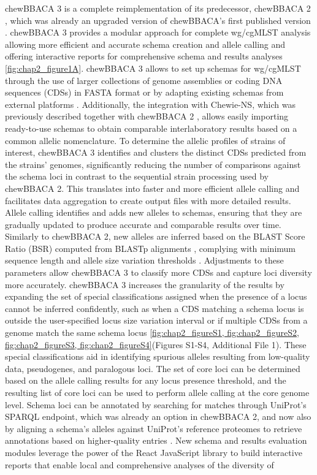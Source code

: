 chewBBACA 3 is a complete reimplementation of its predecessor, chewBBACA 2 \citep{mamede_chewie_2021}, which was already an upgraded version of chewBBACA’s first published version \citep{silva_chewbbaca_2018}. chewBBACA 3 provides a modular approach for complete wg/cgMLST analysis allowing more efficient and accurate schema creation and allele calling and offering interactive reports for comprehensive schema and results analyses \ref{fig:chap2_figure1A}. chewBBACA 3 allows to set up schemas for wg/cgMLST through the use of larger collections of genome assemblies or coding DNA sequences (CDSs) in FASTA format or by adapting existing schemas from external platforms \citep{jolley_bigsdb_2010, zhou_enterobase_2020, noauthor_cgmlstorg_nodate}. Additionally, the integration with Chewie-NS, which was previously described together with chewBBACA 2 \citep{mamede_chewie_2021}, allows easily importing ready-to-use schemas to obtain comparable interlaboratory results based on a common allelic nomenclature. To determine the allelic profiles of strains of interest, chewBBACA 3 identifies and clusters the distinct CDSs predicted from the strains' genomes, significantly reducing the number of comparisons against the schema loci in contrast to the sequential strain processing used by chewBBACA 2. This translates into faster and more efficient allele calling and facilitates data aggregation to create output files with more detailed results. Allele calling identifies and adds new alleles to schemas, ensuring that they are gradually updated to produce accurate and comparable results over time. Similarly to chewBBACA 2, new alleles are inferred based on the BLAST Score Ratio (BSR) \citep{rasko_visualization_2005} computed from BLASTp alignments \citep{camacho_blast_2009}, complying with minimum sequence length and allele size variation thresholds \citep{silva_chewbbaca_2018}. Adjustments to these parameters allow chewBBACA 3 to classify more CDSs and capture loci diversity more accurately. chewBBACA 3 increases the granularity of the results by expanding the set of special classifications assigned when the presence of a locus cannot be inferred confidently, such as when a CDS matching a schema locus is outside the user-specified locus size variation interval or if multiple CDSs from a genome match the same schema locus \ref{fig:chap2_figureS1, fig:chap2_figureS2, fig:chap2_figureS3, fig:chap2_figureS4}(Figures S1-S4, Additional File 1). These special classifications aid in identifying spurious alleles resulting from low-quality data, pseudogenes, and paralogous loci. The set of core loci can be determined based on the allele calling results for any locus presence threshold, and the resulting list of core loci can be used to perform allele calling at the core genome level. Schema loci can be annotated by searching for matches through UniProt’s SPARQL endpoint, which was already an option in chewBBACA 2, and now also by aligning a schema’s alleles against UniProt’s reference proteomes to retrieve annotations based on higher-quality entries \citep{the_uniprot_consortium_uniprot_2025}. New schema and results evaluation modules leverage the power of the React JavaScript library \citep{noauthor_react_nodate} to build interactive reports that enable local and comprehensive analyses of the diversity of 